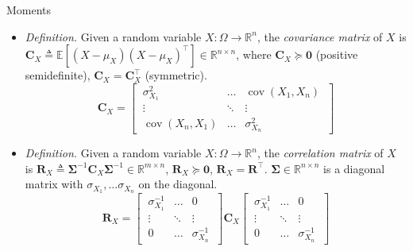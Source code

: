 \documentclass{beamer}
\numberwithin{equation}{section}
\begin{document}
\begin{frame}{Moments}
    \begin{itemize}
        \item
        \textit{Definition.} Given a random variable $ X : \Omega \rightarrow
        \mathbb{R}^n $, the \textit{covariance matrix} of $ X $ is
        $ \mathbf{C}_X \triangleq \mathbb{E}\left[(X - \mu_X)
        (X - \mu_X)^\top\right] \in \mathbb{R}^{n \times n} $, where
        $ \mathbf{C}_X \succeq \mathbf{0} $ (positive semidefinite),
        $ \mathbf{C}_X = \mathbf{C}_X^\top $ (symmetric).
        \begin{equation*}
            \mathbf{C}_X = \begin{bmatrix}
                \ \sigma_{X_1}^2 & \ldots & \operatorname{cov}(X_1, X_n) \ \\
                \ \vdots & \ddots & \vdots \ \\
                \ \operatorname{cov}(X_n, X_1) & \ldots & \sigma_{X_n}^2 \
            \end{bmatrix}
        \end{equation*}

        \item
        \textit{Definition.} Given a random variable $ X : \Omega \rightarrow
        \mathbb{R}^n $, the \textit{correlation matrix} of $ X $ is
        $ \mathbf{R}_X \triangleq \mathbf{\Sigma}^{-1}\mathbf{C}_X
        \mathbf{\Sigma}^{-1} \in \mathbb{R}^{m \times n} $, $ \mathbf{R}_X
        \succeq \mathbf{0} $, $ \mathbf{R}_X = \mathbf{R}^\top $.
        $ \mathbf{\Sigma} \in \mathbb{R}^{n \times n} $ is a diagonal matrix
        with $ \sigma_{X_1}, \ldots \sigma_{X_n} $ on the diagonal.
        \begin{equation*}
            \mathbf{R}_X = \begin{bmatrix}
                \ \sigma_{X_1}^{-1} & \ldots & 0 \ \\
                \ \vdots & \ddots & \vdots \ \\
                \ 0 & \ldots & \sigma_{X_n}^{-1} \
            \end{bmatrix} \mathbf{C}_X \begin{bmatrix}
                \ \sigma_{X_1}^{-1} & \ldots & 0 \ \\
                \ \vdots & \ddots & \vdots \ \\
                \ 0 & \ldots & \sigma_{X_n}^{-1} \
            \end{bmatrix}
        \end{equation*}
    \end{itemize}
\end{frame}
\end{document}
